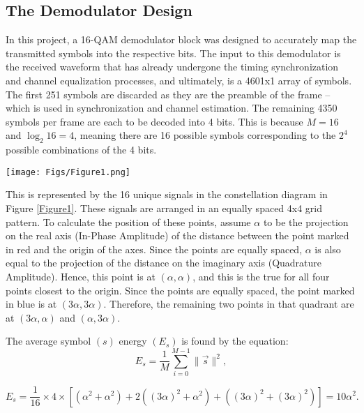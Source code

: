 \begin{flushleft}
\subsection*{The Demodulator Design} 
In this project, a 16-QAM demodulator block was designed to accurately map the transmitted
symbols into the respective bits. The input to this demodulator is the received waveform that
has already undergone the timing synchronization and channel equalization processes, and
ultimately, is a 4601x1 array of symbols. The first 251 symbols are discarded as they are the
preamble of the frame – which is used in synchronization and channel estimation. The remaining 4350 symbols per frame are each to be decoded into 4 bits. This is because $M = 16$ and $\log_2{16} = 4$, meaning there are 16 possible symbols corresponding to the $2^4$ possible combinations of the 4 bits.

\begin{center}
    \begin{minipage}{0.5\linewidth}
    \centering
    \texttt{[image: Figs/Figure1.png]}
    \label{Figure1}
    \end{minipage} \break
\end{center}

This is represented by the 16 unique signals in the constellation diagram in Figure \ref{Figure1}. These signals are arranged in an equally spaced 4x4 grid pattern. To calculate the position of these points, assume $\alpha$ to be the projection on the real axis (In-Phase Amplitude) of the
distance between the point marked in red and the origin of the axes. Since the points are
equally spaced, $\alpha$ is also equal to the projection of the distance on the imaginary
axis (Quadrature Amplitude). Hence, this point is at $(\alpha, \alpha)$, and this is the true for all four points closest to the origin. Since the points are equally spaced, the point marked in blue is at $(3\alpha, 3\alpha)$. Therefore, the remaining two points in that quadrant are at $(3\alpha, \alpha)$ and $(\alpha, 3\alpha)$. \break

The average symbol $(s)$ energy $(E_s)$ is found by the equation:
\[
    E_s = \frac{1}{M} \sum_{i=0}^{M-1} \| \vec{s} \|^2,
\]

\[
    E_s = \frac{1}{16} \times 4 \times [(\alpha^2 + \alpha^2) + 2((3\alpha)^2 + \alpha^2) + ((3\alpha)^2 + (3\alpha)^2)] = 10\alpha^2.
\] \break


\end{flushleft}
